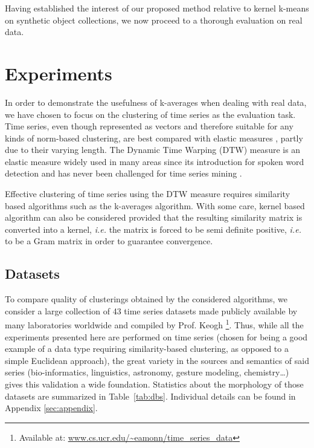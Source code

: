 \documentclass[natbib,smallextended]{svjour3}
\begin{document}
Having established the interest of our proposed method relative to kernel k-means on synthetic object collections, we now proceed to a thorough evaluation on real data.

\section{Experiments}
\label{sec:experiments}

In order to demonstrate the usefulness of k-averages when dealing with real data, we have chosen to focus on the clustering of time series as the evaluation task. Time series, even though represented as vectors and therefore suitable for any kinds of norm-based clustering, are best compared with elastic measures \citep{Ding:2008:QMT:1454159.1454226, Wang:2013:ECR:2429736.2429754}, partly due to their varying length. The Dynamic Time Warping (DTW) measure is an elastic measure widely used in many areas since its introduction for spoken word detection \citep{1163055} and has never been challenged for time series mining \citep{conf/kdd/BerndtC94, Rakthanmanon:2013:ABD:2513092.2500489}.

Effective clustering of time series using the DTW measure requires similarity based algorithms such as the k-averages algorithm. With some care, kernel based algorithm can also be considered provided that the resulting similarity matrix is converted into a kernel, \textit{i.e.} the matrix is forced to be semi definite positive, \textit{i.e.} to be a Gram matrix \citep{Lanckriet:2004:LKM:1005332.1005334} in order to guarantee convergence.

\subsection{Datasets}

To compare quality of clusterings obtained by the considered algorithms, we consider a large collection of 43 time series datasets made publicly available by many laboratories worldwide and compiled by Prof. Keogh \footnote{Available at: \url{www.cs.ucr.edu/~eamonn/time_series_data}}. Thus, while all the experiments presented here are performed on time series (chosen for being a good example of a data type requiring similarity-based clustering, as opposed to a simple Euclidean approach), the great variety in the sources and semantics of said series (bio-informatics, linguistics, astronomy, gesture modeling, chemistry\ldots{}) gives this validation a wide foundation. Statistics about the morphology of those datasets are summarized in Table~\ref{tab:dbs}. Individual details can be found in Appendix \ref{sec:appendix}.
\end{document}
